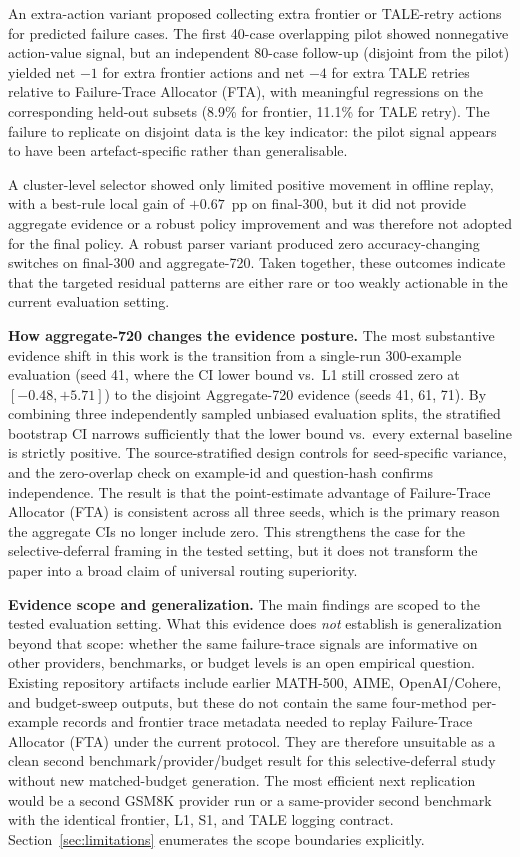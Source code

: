 An extra-action variant proposed collecting extra frontier or TALE-retry actions for predicted
failure cases.
The first 40-case overlapping pilot showed nonnegative action-value signal, but
an independent 80-case follow-up (disjoint from the pilot) yielded
net $-1$ for extra frontier actions and net $-4$ for extra TALE retries relative to Failure-Trace Allocator (FTA),
with meaningful regressions on the corresponding held-out subsets (8.9\% for frontier, 11.1\% for TALE retry).
The failure to replicate on disjoint data is the key indicator: the pilot signal
appears to have been artefact-specific rather than generalisable.

A cluster-level selector showed only limited positive movement in offline replay,
with a best-rule local gain of $+0.67$~pp on final-300, but it did not provide
aggregate evidence or a robust policy improvement and was therefore not adopted for the final policy.
A robust parser variant produced zero accuracy-changing switches on
final-300 and aggregate-720.
Taken together, these outcomes indicate that the targeted residual patterns are either
rare or too weakly actionable in the current evaluation setting.

\medskip\noindent\textbf{How aggregate-720 changes the evidence posture.}
The most substantive evidence shift in this work is the transition from a single-run
300-example evaluation (seed 41, where the CI lower bound vs.\ L1 still crossed zero
at $[-0.48, +5.71]$) to the disjoint Aggregate-720 evidence (seeds 41, 61, 71).
By combining three independently sampled unbiased evaluation splits, the stratified
bootstrap CI narrows sufficiently that the lower bound vs.\ every external baseline
is strictly positive.
The source-stratified design controls for
seed-specific variance, and the zero-overlap check on example-id and question-hash
confirms independence.
The result is that the point-estimate advantage of Failure-Trace Allocator (FTA)
is consistent across all three seeds, which is the primary reason the aggregate
CIs no longer include zero. This strengthens the case for the selective-deferral
framing in the tested setting, but it does not transform the paper into a broad
claim of universal routing superiority.

\medskip\noindent\textbf{Evidence scope and generalization.}
The main findings are scoped to the tested evaluation setting.
What this evidence does \emph{not} establish is generalization beyond that scope:
whether the same failure-trace signals are informative on other providers,
benchmarks, or budget levels is an open empirical question.
Existing repository artifacts include earlier MATH-500, AIME, OpenAI/Cohere, and
budget-sweep outputs, but these do not contain the same four-method per-example
records and frontier trace metadata needed to replay Failure-Trace Allocator (FTA) under the current
protocol.
They are therefore unsuitable as a clean second benchmark/provider/budget result
for this selective-deferral study without new matched-budget generation.
The most efficient next replication would be a second GSM8K provider run or a
same-provider second benchmark with the identical frontier, L1, S1, and TALE
logging contract.
Section~\ref{sec:limitations} enumerates the scope boundaries explicitly.
